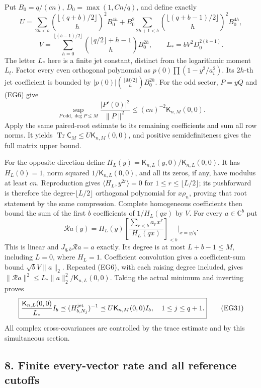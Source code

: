 \documentclass[10pt]{article}
\begin{document}
Put \(B_0=q/(cn)\), \(D_0=\max(1,Cn/q)\), and define exactly \[
 U=\sum_{2h<b}\binom{\lfloor(q+b)/2\rfloor}{h}^{2}B_0^{4h}
 +B_0^2\sum_{2h+1<b}\binom{\lfloor(q+b-1)/2\rfloor}{h}^{2}B_0^{4h},
\] \[
 V=\sum_{h=0}^{\lfloor(b-1)/2\rfloor}
 \binom{\lfloor q/2\rfloor+h-1}{h}B_0^{2h},
 \qquad L_*=bV^2D_0^{2(b-1)}.
 \tag{EG29}
\] The letter \(L_*\) here is a finite jet constant, distinct from the logarithmic moment \(L_t\). Factor every even orthogonal polynomial as \(p(0)\prod(1-y^2/a_i^2)\). Its \(2h\)-th jet coefficient is bounded by \(|p(0)|\binom{\lfloor M/2\rfloor}{h}B_0^{2h}\). For the odd sector, \(P=yQ\) and (EG6) give \[
 \sup_{P\ \mathrm{odd},\deg P\le M}\frac{|P'(0)|^2}{\|P\|^2}
 \le(cn)^{-2}\mathsf K_{n,M}(0,0).
\] Apply the same paired-root estimate to its remaining coefficients and sum all row norms. It yields \(\operatorname{Tr}\mathsf C_M\le U\mathsf K_{n,M}(0,0)\), and positive semidefiniteness gives the full matrix upper bound.

For the opposite direction define \(H_L(y)=\mathsf K_{n,L}(y,0)/\mathsf K_{n,L}(0,0)\). It has \(H_L(0)=1\), norm squared \(1/\mathsf K_{n,L}(0,0)\), and all its zeros, if any, have modulus at least \(cn\). Reproduction gives \(\langle H_L,y^{2r}\rangle=0\) for \(1\le r\le\lfloor L/2\rfloor\); its pushforward is therefore the degree-\(\lfloor L/2\rfloor\) orthogonal polynomial for \(x\rho_n\), proving that root statement by the same compression. Complete homogeneous coefficients then bound the sum of the first \(b\) coefficients of \(1/H_L(qx)\) by \(V\). For every \(a\in\mathbb C^b\) put \[
 \mathcal R a(y)=H_L(y)\left[\frac{\sum_{r<b}a_rx^r}{H_L(qx)}\right]_{<b}\Big|_{x=y/q}.
 \tag{EG30}
\] This is linear and \(J_{q,b}\mathcal R a=a\) exactly. Its degree is at most \(L+b-1\le M\), including \(L=0\), where \(H_L=1\). Coefficient convolution gives a coefficient-sum bound \(\sqrt b V\|a\|_2\). Repeated (EG6), with each raising degree included, gives \(\|\mathcal R a\|^2\le L_*\|a\|_2^2/\mathsf K_{n,L}(0,0)\). Taking the actual minimum and inverting proves \[
 \boxed{\frac{\mathsf K_{n,L}(0,0)}{L_*}I_b
 \preceq(H^{\rm jet}_{b,N_j})^{-1}
 \preceq U\mathsf K_{n,M}(0,0)I_b,\quad1\le j\le q+1.}
 \tag{EG31}
\] All complex cross-covariances are controlled by the trace estimate and by this simultaneous section.

\subsection{8. Finite every-vector rate and all reference cutoffs}\label{finite-every-vector-rate-and-all-reference-cutoffs}
\end{document}
